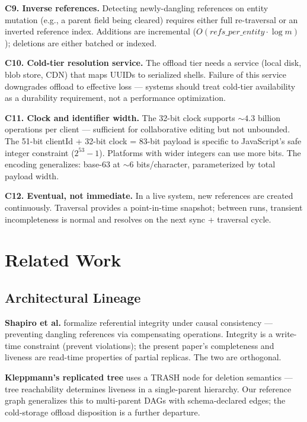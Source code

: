 \textbf{C9. Inverse references.} Detecting newly-dangling references on entity mutation (e.g., a parent field being cleared) requires either full re-traversal or an inverted reference index. Additions are incremental ($O(\mathit{refs\_per\_entity} \cdot \log m)$); deletions are either batched or indexed.

\textbf{C10. Cold-tier resolution service.} The offload tier needs a service (local disk, blob store, CDN) that maps UUIDs to serialized shells. Failure of this service downgrades offload to effective loss --- systems should treat cold-tier availability as a durability requirement, not a performance optimization.

\textbf{C11. Clock and identifier width.} The 32-bit clock supports ${\sim}4.3$ billion operations per client --- sufficient for collaborative editing but not unbounded. The 51-bit clientId + 32-bit clock = 83-bit payload is specific to JavaScript's safe integer constraint ($2^{53} - 1$). Platforms with wider integers can use more bits. The encoding generalizes: base-63 at ${\sim}6$ bits/character, parameterized by total payload width.

\textbf{C12. Eventual, not immediate.} In a live system, new references are created continuously. Traversal provides a point-in-time snapshot; between runs, transient incompleteness is normal and resolves on the next sync + traversal cycle.

\section{Related Work}

\subsection{Architectural Lineage}

\textbf{Shapiro et al.}\cite{shapiro2018integrity} formalize referential integrity under causal consistency --- preventing dangling references via compensating operations. Integrity is a write-time constraint (prevent violations); the present paper's completeness and liveness are read-time properties of partial replicas. The two are orthogonal.

\textbf{Kleppmann's replicated tree}\cite{kleppmann2021tree} uses a TRASH node for deletion semantics --- tree reachability determines liveness in a single-parent hierarchy. Our reference graph generalizes this to multi-parent DAGs with schema-declared edges; the cold-storage offload disposition is a further departure.

